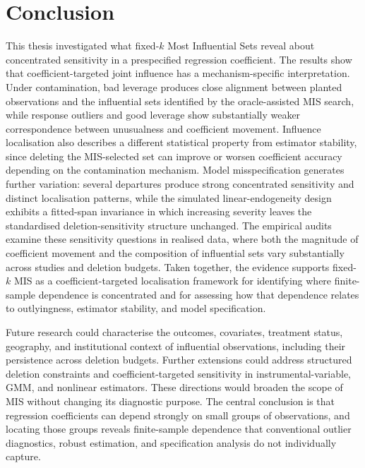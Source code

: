 \documentclass[../main.tex]{subfiles}
\begin{document}
\section{Conclusion}
\label{sec:conclusion}

This thesis investigated what fixed-\(k\) Most Influential Sets reveal about concentrated sensitivity in a prespecified regression coefficient. The results show that coefficient-targeted joint influence has a mechanism-specific interpretation. Under contamination, bad leverage produces close alignment between planted observations and the influential sets identified by the oracle-assisted MIS search, while response outliers and good leverage show substantially weaker correspondence between unusualness and coefficient movement. Influence localisation also describes a different statistical property from estimator stability, since deleting the MIS-selected set can improve or worsen coefficient accuracy depending on the contamination mechanism. Model misspecification generates further variation: several departures produce strong concentrated sensitivity and distinct localisation patterns, while the simulated linear-endogeneity design exhibits a fitted-span invariance in which increasing severity leaves the standardised deletion-sensitivity structure unchanged. The empirical audits examine these sensitivity questions in realised data, where both the magnitude of coefficient movement and the composition of influential sets vary substantially across studies and deletion budgets. Taken together, the evidence supports fixed-\(k\) MIS as a coefficient-targeted localisation framework for identifying where finite-sample dependence is concentrated and for assessing how that dependence relates to outlyingness, estimator stability, and model specification.

Future research could characterise the outcomes, covariates, treatment status, geography, and institutional context of influential observations, including their persistence across deletion budgets. Further extensions could address structured deletion constraints and coefficient-targeted sensitivity in instrumental-variable, GMM, and nonlinear estimators. These directions would broaden the scope of MIS without changing its diagnostic purpose. The central conclusion is that regression coefficients can depend strongly on small groups of observations, and locating those groups reveals finite-sample dependence that conventional outlier diagnostics, robust estimation, and specification analysis do not individually capture.
\end{document}
